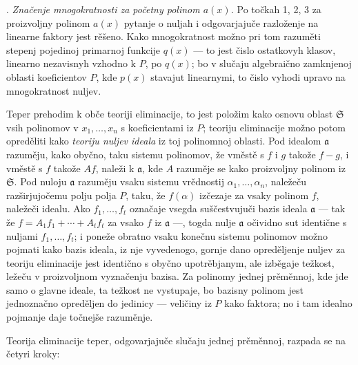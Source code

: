 \documentclass[11pt]{article}
\providecommand{\fraka}{\mathfrak a}
\providecommand{\frakS}{\mathfrak S}
\begin{document}
. \emph{Značenje mnogokratnosti za početny polinom $a(x)$.} Po točkah 1, 2, 3 za proizvoljny polinom $a(x)$ pytanje o nuljah i odgovarjajuče razloženje na linearne faktory jest rěšeno. Kako mnogokratnost možno pri tom razuměti stepenj pojedinoj primarnoj funkcije $q(x)$ --- to jest čislo ostatkovyh klasov, linearno nezavisnyh vzhodno k $P$, po $q(x)$; bo v slučaju algebraično zamknjenoj oblasti koeficientov $P$, kde $p(x)$ stavajut linearnymi, to čislo vyhodi upravo na mnogokratnost nuljev.

Teper prehodim k obče teoriji eliminacije, to jest položim kako osnovu oblast $\frakS$ vsih polinomov v $x_1,\ldots,x_n$ s koeficientami iz $P$; teoriju eliminacije možno potom opreděliti kako \emph{teoriju nuljev ideala} iz toj polinomnoj oblasti. Pod idealom $\fraka$ razuměju, kako obyčno, taku sistemu polinomov, že vměstě s $f$ i $g$ takože $f-g$, i vměstě s $f$ takože $Af$, naleži k $\fraka$, kde $A$ razuměje se kako proizvoljny polinom iz $\frakS$. Pod nuloju $\fraka$ razuměju vsaku sistemu vrědnostij $\alpha_1,\ldots,\alpha_n$, naležeču razširjujočemu polju polja $P$, taku, že $f(\alpha)$ izčezaje za vsaky polinom $f$, naležeči idealu. Ako $f_1,\ldots,f_t$ označaje vsegda suščestvujuči bazis ideala $\fraka$ --- tak že $f=A_1f_1+\cdots+A_tf_t$ za vsako $f$ iz $\fraka$ ---, togda nulje $\fraka$ očividno sut identične s nuljami $f_1,\ldots,f_t$; i poneže obratno vsaku konečnu sistemu polinomov možno pojmati kako bazis ideala, iz nje vyvedenogo, gornje dano opreděljenje nuljev za teoriju eliminacije jest identično s obyčno upotrěbjanym, ale izběgaje težkost, ležeču v proizvoljnom vyznačenju bazisa. Za polinomy jednej prěměnnoj, kde jde samo o glavne ideale, ta težkost ne vystupaje, bo bazisny polinom jest jednoznačno opreděljen do jedinicy --- veličiny iz $P$ kako faktora; no i tam idealno pojmanje daje točnejše razuměnje.

Teorija eliminacije teper, odgovarjajuče slučaju jednej prěměnnoj, razpada se na četyri kroky:
\end{document}
